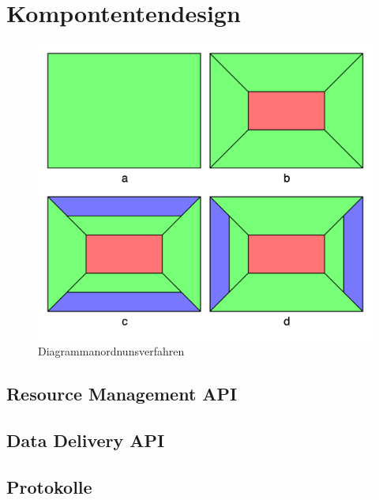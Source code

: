 \chapter{Kompontentendesign}
\label{chap:komponentendesign}

\begin{figure}
    \label{figure:diagrammanordnungsverfahren}
    \begin{center}
    \includegraphics[scale=0.2]{img/abbildungen/Diagrammanordnunsverfahren}
    \end{center}
    \caption{Diagrammanordnunsverfahren}
\end{figure}

\section{Resource Management API}
\label{sec:resourcemanagementapi}

\section{Data Delivery API}
\label{sec:datadeliveryapi}

\section{Protokolle}
\label{sec:protokolle}
